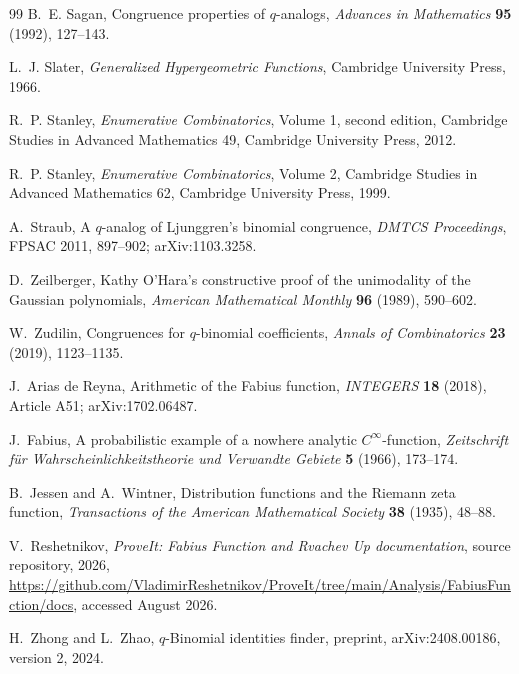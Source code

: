\documentclass[11pt,oneside,openany]{book}
\theoremstyle{definition}
\theoremstyle{remark}
\begin{document}
\begin{thebibliography}{99}
B.~E. Sagan,
Congruence properties of $q$-analogs,
\emph{Advances in Mathematics} \textbf{95} (1992), 127--143.

L.~J. Slater,
\emph{Generalized Hypergeometric Functions},
Cambridge University Press, 1966.

R.~P. Stanley,
\emph{Enumerative Combinatorics}, Volume 1, second edition,
Cambridge Studies in Advanced Mathematics 49, Cambridge University Press, 2012.

R.~P. Stanley,
\emph{Enumerative Combinatorics}, Volume 2,
Cambridge Studies in Advanced Mathematics 62, Cambridge University Press, 1999.

A.~Straub,
A $q$-analog of Ljunggren's binomial congruence,
\emph{DMTCS Proceedings}, FPSAC 2011, 897--902; arXiv:1103.3258.

D.~Zeilberger,
Kathy O'Hara's constructive proof of the unimodality of the Gaussian polynomials,
\emph{American Mathematical Monthly} \textbf{96} (1989), 590--602.

W.~Zudilin,
Congruences for $q$-binomial coefficients,
\emph{Annals of Combinatorics} \textbf{23} (2019), 1123--1135.


J.~Arias de Reyna,
Arithmetic of the Fabius function,
\emph{INTEGERS} \textbf{18} (2018), Article A51; arXiv:1702.06487.

J.~Fabius,
A probabilistic example of a nowhere analytic $C^\infty$-function,
\emph{Zeitschrift f\"ur Wahrscheinlichkeitstheorie und Verwandte Gebiete}
\textbf{5} (1966), 173--174.

B.~Jessen and A.~Wintner,
Distribution functions and the Riemann zeta function,
\emph{Transactions of the American Mathematical Society}
\textbf{38} (1935), 48--88.

V.~Reshetnikov,
\emph{ProveIt: Fabius Function and Rvachev Up documentation},
source repository, 2026,
\url{https://github.com/VladimirReshetnikov/ProveIt/tree/main/Analysis/FabiusFunction/docs},
accessed August 2026.

H.~Zhong and L.~Zhao,
$q$-Binomial identities finder,
preprint, arXiv:2408.00186, version 2, 2024.

\end{thebibliography}

\printindex
\end{document}
